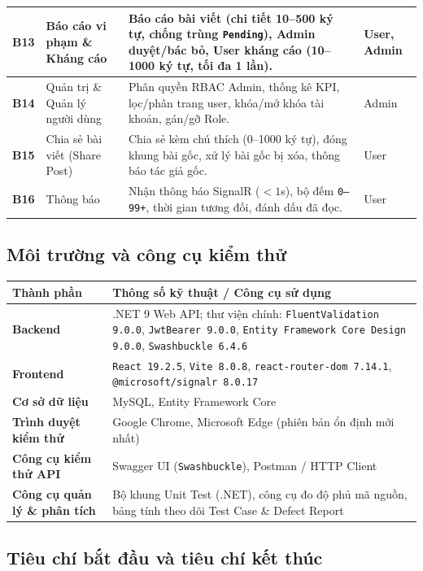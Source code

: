 \documentclass[11pt,a4paper]{article}
\begin{document}
\begin{longtable}{|C{1.1cm}|L{4.3cm}|L{8.4cm}|C{2.0cm}|}
\textbf{B13} & Báo cáo vi phạm \& Kháng cáo & Báo cáo bài viết (chi tiết 10--500 ký tự, chống trùng \texttt{Pending}), Admin duyệt/bác bỏ, User kháng cáo (10--1000 ký tự, tối đa 1 lần). & User, Admin \\ \hline
\textbf{B14} & Quản trị \& Quản lý người dùng & Phân quyền RBAC Admin, thống kê KPI, lọc/phân trang user, khóa/mở khóa tài khoản, gán/gỡ Role. & Admin \\ \hline
\textbf{B15} & Chia sẻ bài viết (Share Post) & Chia sẻ kèm chú thích (0--1000 ký tự), đóng khung bài gốc, xử lý bài gốc bị xóa, thông báo tác giả gốc. & User \\ \hline
\textbf{B16} & Thông báo & Nhận thông báo SignalR ($<1$s), bộ đếm \texttt{0--99+}, thời gian tương đối, đánh dấu đã đọc. & User \\ \hline
\end{longtable}

\subsection{Môi trường và công cụ kiểm thử}
\begin{table}[H]
\centering
\small
\begin{tabularx}{\textwidth}{|L{4.2cm}|X|}
\hline
{}
\textbf{Thành phần} & \textbf{Thông số kỹ thuật / Công cụ sử dụng} \tabularnewline
\hline
\textbf{Backend} & .NET 9 Web API; thư viện chính: \texttt{FluentValidation 9.0.0}, \texttt{JwtBearer 9.0.0}, \texttt{Entity Framework Core Design 9.0.0}, \texttt{Swashbuckle 6.4.6} \\ \hline
\textbf{Frontend} & \texttt{React 19.2.5}, \texttt{Vite 8.0.8}, \texttt{react-router-dom 7.14.1}, \texttt{@microsoft/signalr 8.0.17} \\ \hline
\textbf{Cơ sở dữ liệu} & MySQL, Entity Framework Core \\ \hline
\textbf{Trình duyệt kiểm thử} & Google Chrome, Microsoft Edge (phiên bản ổn định mới nhất) \\ \hline
\textbf{Công cụ kiểm thử API} & Swagger UI (\texttt{Swashbuckle}), Postman / HTTP Client \\ \hline
\textbf{Công cụ quản lý \& phân tích} & Bộ khung Unit Test (.NET), công cụ đo độ phủ mã nguồn, bảng tính theo dõi Test Case \& Defect Report \\ \hline
\end{tabularx}
\end{table}

\subsection{Tiêu chí bắt đầu và tiêu chí kết thúc}
\end{document}
